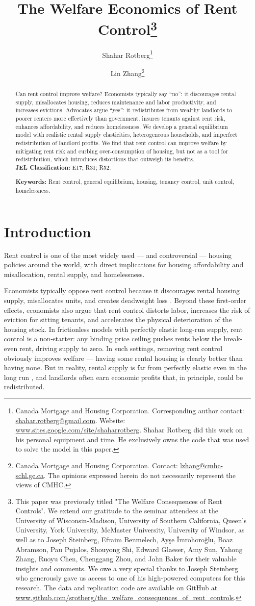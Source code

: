 \documentclass[parskip=full]{article}
\title{\vspace{-1.8cm}The Welfare Economics of Rent Control\footnote{This paper was previously titled "The Welfare Consequences of Rent Controls". We extend our gratitude to the seminar attendees at the University of Wisconsin-Madison, University of Southern California, Queen's University, York University, McMaster University, University of Windsor, as well as to Joseph Steinberg, Efraim Benmelech, Ay\c{s}e \.{I}mrohoro\u{g}lu, Boaz Abramson, Pau Pujalos, Shouyong Shi, Edward Glaeser, Amy Sun, Yahong Zhang, Ruoyu Chen, Chenggang Zhou, and John Baker for their valuable insights and comments. We owe a very special thanks to Joseph Steinberg who generously gave us access to one of his high-powered computers for this research. The data and replication code are available on GitHub at \url{www.github.com/srotberg/the_welfare_consequences_of_rent_controls}.}}
\author{Shahar Rotberg\footnote{Canada Mortgage and Housing Corporation. Corresponding author contact: \url{shahar.rotberg@gmail.com}. Website: \url{www.sites.google.com/site/shaharrotberg}. Shahar Rotberg did this work on his personal equipment and time. He exclusively owns the code that was used to solve the model in this paper.} \and Lin Zhang\footnote{Canada Mortgage and Housing Corporation. Contact: \url{lzhang@cmhc-schl.gc.ca}. The opinions expressed herein do not necessarily represent the views of CMHC.}}
\begin{document}
\maketitle

\begin{abstract}
\onehalfspacing

\noindent Can rent control improve welfare? Economists typically say “no”: it discourages rental supply, misallocates housing, reduces maintenance and labor productivity, and increases evictions. Advocates argue “yes”: it redistributes from wealthy landlords to poorer renters more effectively than government, insures tenants against rent risk, enhances affordability, and reduces homelessness. We develop a general equilibrium model with realistic rental supply elasticities, heterogeneous households, and imperfect redistribution of landlord profits. We find that rent control can improve welfare by mitigating rent risk and curbing over-consumption of housing, but not as a tool for redistribution, which introduces distortions that outweigh its benefits.
\\[1.5ex]

\noindent \textbf{JEL Classification:} E17; R31; R52. 

\noindent \textbf{Keywords:} Rent control, general equilibrium, housing, tenancy control, unit control, homelessness.
\end{abstract}

\section{Introduction}

Rent control is one of the most widely used — and controversial — housing policies around the world, with direct implications for housing affordability and misallocation, rental supply, and homelessness.

Economists typically oppose rent control because it discourages rental housing supply, misallocates units, and creates deadweight loss \citep{gl-2003}. Beyond these first-order effects, economists also argue that rent control distorts labor, increases the risk of eviction for sitting tenants, and accelerates the physical deterioration of the housing stock. In frictionless models with perfectly elastic long-run supply, rent control is a non-starter: any binding price ceiling pushes rents below the break-even rent, driving supply to zero. In such settings, removing rent control obviously improves welfare — having some rental housing is clearly better than having none. But in reality, rental supply is far from perfectly elastic even in the long run \citep{cy-1994,susin-2002,fack-2006,sy-2020,rs-2023}, and landlords often earn economic profits that, in principle, could be redistributed.
\end{document}
